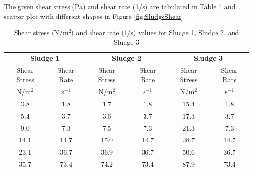 \documentclass[a4paper]{article}
\begin{document}
\section{}
The given shear stress (Pa) and shear rate (1/s) are tabulated in Table \ref{tab:rheology} and scatter plot with different shapes in Figure \ref{fig:SludgeShear}.
\begin{table}[ht]
    \caption{Shear stress (N/m$^2$) and shear rate (1/s) values for Sludge 1, Sludge 2, and Sludge 3}
    \centering
    \begin{tabular}{cccccc}
         \toprule
         \multicolumn{2}{c}{\textbf{Sludge 1}} & \multicolumn{2}{c}{\textbf{Sludge 2}} & \multicolumn{2}{c}{\textbf{Sludge 3}} \\
         \cmidrule(lr){1-2} \cmidrule(lr){3-4} \cmidrule(lr){5-6}
         Shear Stress & Shear Rate & Shear Stress & Shear Rate & Shear Stress & Shear Rate \\
         N/m$^2$ & s$^{-1}$ & N/m$^2$ & s$^{-1}$ & N/m$^2$ & s$^{-1}$ \\
         \cmidrule(lr){1-1} \cmidrule(lr){2-2} \cmidrule(lr){3-3} \cmidrule(lr){4-4} \cmidrule(lr){5-5} \cmidrule(lr){6-6}
         3.8	& 1.8	& 1.7	& 1.8	& 15.4	& 1.8 \\
         5.4	& 3.7	& 3.6	& 3.7	& 17.3	& 3.7 \\
         9.0	& 7.3	& 7.5	& 7.3	& 21.3	& 7.3 \\
         14.1 & 14.7	& 15.0	& 14.7 & 28.7 & 14.7 \\
         23.1 & 36.7 & 36.9 & 36.7 & 50.6 & 36.7 \\
         35.7 & 73.4 & 74.2 & 73.4 & 87.9 & 73.4 \\
         \bottomrule
    \end{tabular}
    \label{tab:rheology}
\end{table}
\end{document}
